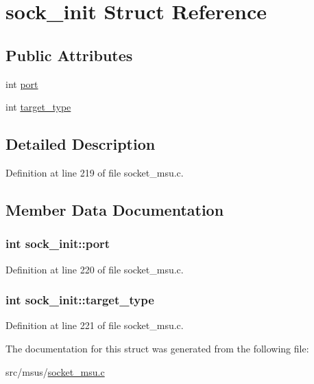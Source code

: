 \hypertarget{structsock__init}{\section{sock\-\_\-init Struct Reference}
\label{structsock__init}
}
\subsection*{Public Attributes}
\begin{DoxyCompactItemize}
\item 
int \hyperlink{structsock__init_ac593df260ab8a897e1d2238746b2815a}{port}
\item 
int \hyperlink{structsock__init_a17b3cc4807be7313acf0de7aea1cf1fb}{target\-\_\-type}
\end{DoxyCompactItemize}


\subsection{Detailed Description}


Definition at line 219 of file socket\-\_\-msu.\-c.



\subsection{Member Data Documentation}
\hypertarget{structsock__init_ac593df260ab8a897e1d2238746b2815a}{
\subsubsection[{port}]{\setlength{\rightskip}{0pt plus 5cm}int sock\-\_\-init\-::port}}\label{structsock__init_ac593df260ab8a897e1d2238746b2815a}


Definition at line 220 of file socket\-\_\-msu.\-c.

\hypertarget{structsock__init_a17b3cc4807be7313acf0de7aea1cf1fb}{
\subsubsection[{target\-\_\-type}]{\setlength{\rightskip}{0pt plus 5cm}int sock\-\_\-init\-::target\-\_\-type}}\label{structsock__init_a17b3cc4807be7313acf0de7aea1cf1fb}


Definition at line 221 of file socket\-\_\-msu.\-c.



The documentation for this struct was generated from the following file\-:\begin{DoxyCompactItemize}
\item 
src/msus/\hyperlink{socket__msu_8c}{socket\-\_\-msu.\-c}\end{DoxyCompactItemize}
